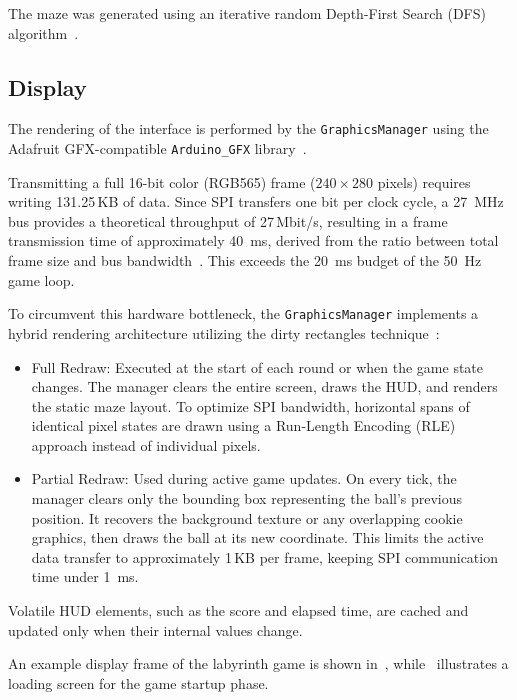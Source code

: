 \documentclass[10pt,journal,final,a4paper]{IEEEtran}
\begin{document}
The maze was generated using an iterative random Depth-First Search (DFS) algorithm~\cite{maze2026dfs}.

\subsection{Display}
\label{subsec:display}

The rendering of the interface is performed by the \texttt{GraphicsManager} using the Adafruit GFX-compatible \texttt{Arduino\_GFX} library~\cite{arduino2026gfx}.

Transmitting a full 16-bit color (RGB565) frame ($240 \times 280$ pixels) requires writing \num{131.25}\,KB of data. Since SPI transfers one bit per clock cycle, a \SI{27}{\mega\hertz} bus provides a theoretical throughput of \num{27}\,Mbit/s, resulting in a frame transmission time of approximately \SI{40}{\milli\second}, derived from the ratio between total frame size and bus bandwidth~\cite{computools2026spi}. This exceeds the \SI{20}{\milli\second} budget of the \SI{50}{\hertz} game loop.

To circumvent this hardware bottleneck, the \texttt{GraphicsManager} implements a hybrid rendering architecture utilizing the dirty rectangles technique~\cite{studyraid2025dirtyrect}:

\begin{itemize}
    \item Full Redraw: Executed at the start of each round or when the game state changes. The manager clears the entire screen, draws the HUD, and renders the static maze layout. To optimize SPI bandwidth, horizontal spans of identical pixel states are drawn using a Run-Length Encoding (RLE)~\cite{peterson2023computer} approach instead of individual pixels.
    \item Partial Redraw: Used during active game updates. On every tick, the manager clears only the bounding box representing the ball's previous position. It recovers the background texture or any overlapping cookie graphics, then draws the ball at its new coordinate. This limits the active data transfer to approximately \num{1}\,KB per frame, keeping SPI communication time under \SI{1}{\milli\second}.
\end{itemize}

Volatile HUD elements, such as the score and elapsed time, are cached and updated only when their internal values change.

An example display frame of the labyrinth game is shown in~, while~ illustrates a loading screen for the game startup phase.
\end{document}
